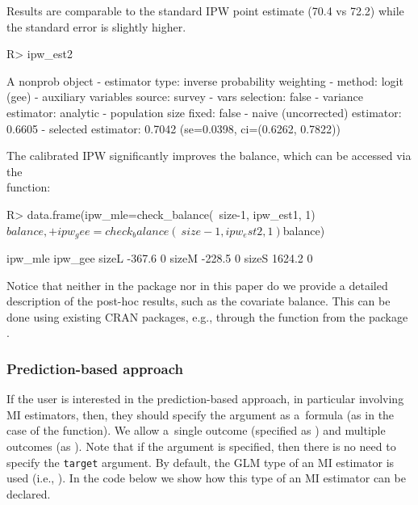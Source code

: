 \documentclass[
]{jss}
\begin{document}
Results are comparable to the standard IPW point estimate (70.4 vs 72.2)
while the standard error is slightly higher.

\begin{CodeChunk}
\begin{CodeInput}
R> ipw_est2
\end{CodeInput}
\begin{CodeOutput}
A nonprob object
 - estimator type: inverse probability weighting
 - method: logit (gee)
 - auxiliary variables source: survey
 - vars selection: false
 - variance estimator: analytic
 - population size fixed: false
 - naive (uncorrected) estimator: 0.6605
 - selected estimator: 0.7042 (se=0.0398, ci=(0.6262, 0.7822))
\end{CodeOutput}
\end{CodeChunk}

The calibrated IPW significantly improves the balance, which can be
accessed via the \\  function:

\begin{CodeChunk}
\begin{CodeInput}
R> data.frame(ipw_mle=check_balance(~size-1, ipw_est1, 1)$balance,
+            ipw_gee=check_balance(~size-1, ipw_est2, 1)$balance)
\end{CodeInput}
\begin{CodeOutput}
      ipw_mle ipw_gee
sizeL  -367.6       0
sizeM  -228.5       0
sizeS  1624.2       0
\end{CodeOutput}
\end{CodeChunk}

Notice that neither in the package nor in this paper do we provide a
detailed description of the post-hoc results, such as the covariate
balance. This can be done using existing CRAN packages, e.g., through
the  function from the  package
\citep{cobalt}.

\subsubsection{Prediction-based
approach}\label{prediction-based-approach}

If the user is interested in the prediction-based approach, in
particular involving MI estimators, then, they should specify the
argument  as a~formula (as in the case of the 
function). We allow a~single outcome (specified as
) and multiple outcomes (as
). Note that if the
 argument is specified, then there is no need to specify
the \texttt{target} argument. By default, the GLM type of an MI
estimator is used (i.e., ). In the code
below we show how this type of an MI estimator can be declared.
\end{document}
